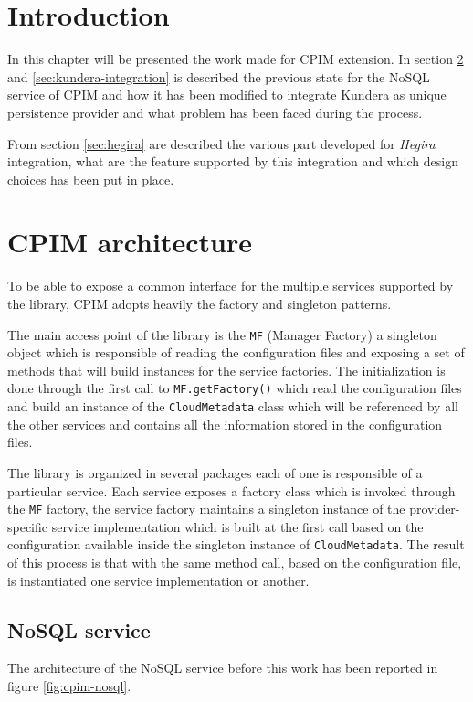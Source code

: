 \section{Introduction}
In this chapter will be presented the work made for CPIM extension. In section \ref{sec:cpim-architecture} and \ref{sec:kundera-integration} is described the previous state for the NoSQL service of CPIM and how it has been modified to integrate Kundera as unique persistence provider and what problem has been faced during the process.

\noindent From section \ref{sec:hegira} are described the various part developed for \textit{Hegira} integration, what are the feature supported by this integration and which design choices has been put in place. 

\section{CPIM architecture}
\label{sec:cpim-architecture}
To be able to expose a common interface for the multiple services supported by the library, CPIM adopts heavily the factory and singleton patterns.

\noindent The main access point of the library is the \texttt{MF} (Manager Factory) a singleton object which is responsible of reading the configuration files and exposing a set of methods that will build instances for the service factories.
The initialization is done through the first call to \texttt{MF.getFactory()} which read the configuration files and build an instance of the \texttt{CloudMetadata} class which will be referenced by all the other services and contains all the information stored in the configuration files.
 
\newparagraph The library is organized in several packages each of one is responsible of a particular service.
\noindent Each service exposes a factory class which is invoked through the \texttt{MF} factory, the service factory maintains a singleton instance of the provider-specific service implementation which is built at the first call based on the configuration available inside the singleton instance of \texttt{CloudMetadata}.
The result of this process is that with the same method call, based on the configuration file, is instantiated one service implementation or another.

\subsection{NoSQL service}
The architecture of the NoSQL service before this work has been reported in figure \ref{fig:cpim-nosql}.

